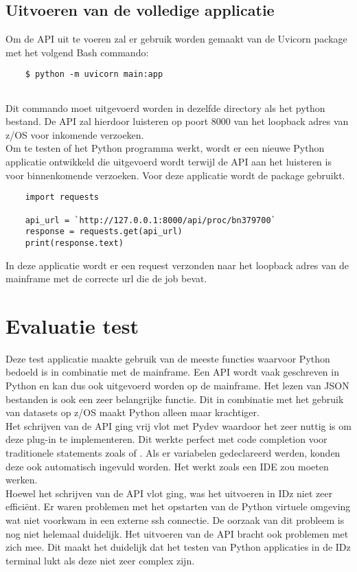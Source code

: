\section{Uitvoeren van de volledige applicatie}
Om de API uit te voeren zal er gebruik worden gemaakt van de Uvicorn package met het volgend Bash commando:

\begin{lstlisting}
    $ python -m uvicorn main:app
    
\end{lstlisting}
Dit commando moet uitgevoerd worden in dezelfde directory als het python bestand. De API zal hierdoor luisteren op poort 8000 van het loopback adres van z/OS voor inkomende verzoeken. \\

Om te testen of het Python programma werkt, wordt er een nieuwe Python applicatie ontwikkeld die uitgevoerd wordt terwijl de API aan het luisteren is voor binnenkomende verzoeken. Voor deze applicatie wordt de  package gebruikt. 

\begin{lstlisting}
    import requests
    
    api_url = `http://127.0.0.1:8000/api/proc/bn379700`    
    response = requests.get(api_url)
    print(response.text)
\end{lstlisting}

In deze applicatie wordt er een request verzonden naar het loopback adres van de mainframe met de correcte url die de job  bevat. 

\chapter{Evaluatie test}
\label{ch:eval-test}
Deze test applicatie maakte gebruik van de meeste functies waarvoor Python bedoeld is in combinatie met de mainframe. Een API wordt vaak geschreven in Python en kan dus ook uitgevoerd worden op de mainframe. Het lezen van JSON bestanden is ook een zeer belangrijke functie. Dit in combinatie met het gebruik van datasets op z/OS maakt Python alleen maar krachtiger. \\

Het schrijven van de API ging vrij vlot met Pydev waardoor het zeer nuttig is om deze plug-in te implementeren. Dit werkte perfect met code completion voor traditionele statements zoals  of . Als er variabelen gedeclareerd werden, konden deze ook automatisch ingevuld worden. Het werkt zoals een IDE zou moeten werken. \\

Hoewel het schrijven van de API vlot ging, was het uitvoeren in IDz niet zeer efficiënt. Er waren problemen met het opstarten van de Python virtuele omgeving wat niet voorkwam in een externe ssh connectie. De oorzaak van dit probleem is nog niet helemaal duidelijk. Het uitvoeren van de API bracht ook problemen met zich mee. Dit maakt het duidelijk dat het testen van Python applicaties in de IDz terminal lukt als deze niet zeer complex zijn.







